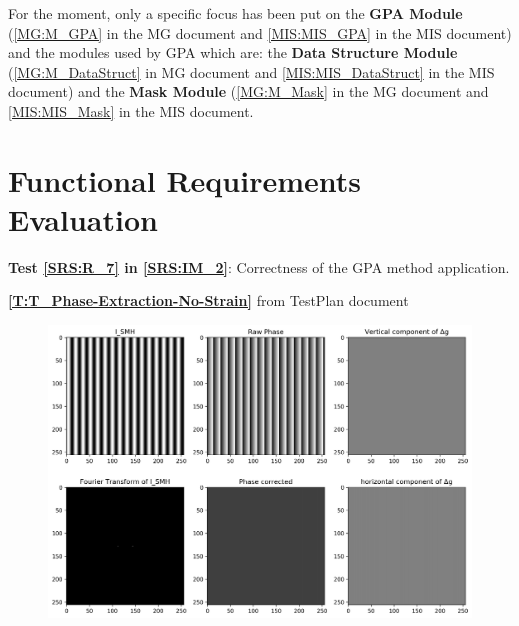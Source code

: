 \documentclass[12pt, titlepage]{article}
\begin{document}
For the moment, only a specific focus has been put on the \textbf{GPA Module} (\cref{MG:M_GPA} in the  MG document and \cref{MIS:MIS_GPA} in the MIS document) and the modules used by GPA which are: the \textbf{Data Structure Module} (\cref{MG:M_DataStruct} in MG document and \cref{MIS:MIS_DataStruct} in the MIS document) and the \textbf{Mask Module} (\cref{MG:M_Mask} in the MG document and \cref{MIS:MIS_Mask} in the MIS document.

\section{Functional Requirements Evaluation}

\textbf{Test \cref{SRS:R_7} in \cref{SRS:IM_2}}: Correctness of the GPA method application.\medskip

\textbf{\cref{T:T_Phase-Extraction-No-Strain}} from TestPlan document

\begin{figure}[H]
\begin{center}
\includegraphics[scale=0.5]{Figures/Test_2_explanation.png}
\caption{}
\label{fig:Test_2_explaination}
\end{center}
\end{figure}
\end{document}
